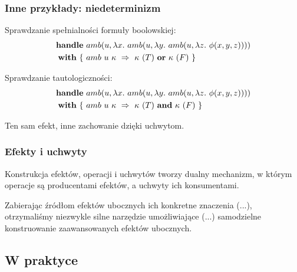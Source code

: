\documentclass[polish, 13pt, usenames, dvipsnames]{beamer}
\begin{document}
\begin{frame}
  \frametitle{Inne przykłady: niedeterminizm}

  Sprawdzanie spełnialności formuły boolowskiej:
  \begin{equation*}\begin{split}
  \handle{
    &\op{amb}{u}{\fun{x}{
        \op{amb}{u}{\fun{y}{
            \op{amb}{u}{\fun{z}{
                \phi(x, y, z)
            }}
        }}
    }}\\
  }{ \{ \ &\hcase{amb}{u\ \kappa}{ \kappa\ (T) \ \mathbf{or} \ \kappa\ (F) } \ \} }
  \end{split}\end{equation*}

  Sprawdzanie tautologiczności:
  \begin{equation*}\begin{split}
  \handle{
    &\op{amb}{u}{\fun{x}{
        \op{amb}{u}{\fun{y}{
            \op{amb}{u}{\fun{z}{
                \phi(x, y, z)
            }}
        }}
    }}\\
  }{ \{ \ &\hcase{amb}{u\ \kappa}{ \kappa\ (T) \ \mathbf{and} \ \kappa\ (F) } \ \} }
  \end{split}\end{equation*}

  Ten sam efekt, inne zachowanie dzięki uchwytom.
\end{frame}

\begin{frame}
  \frametitle{Efekty i uchwyty}
  Konstrukcja efektów, operacji i uchwytów tworzy dualny mechanizm, w którym operacje są producentami efektów, a uchwyty ich konsumentami.

  \vspace{1em}

  Zabierając źródłom efektów ubocznych ich konkretne znaczenia (...), otrzymaliśmy niezwykle silne narzędzie umożliwiające (...) samodzielne konstruowanie zaawansowanych efektów ubocznych.
\end{frame}

\subsection{W praktyce}
\end{document}
